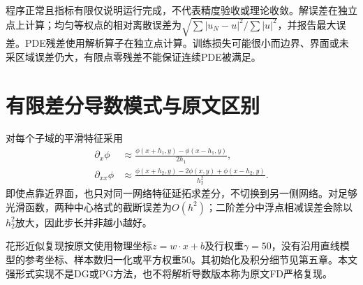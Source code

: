 程序正常且指标有限仅说明运行完成，不代表精度验收或理论收敛。解误差在独立点上计算；均匀等权点的相对离散误差为$\sqrt{\sum|u_N-u|^2/\sum|u|^2}$，并报告最大误差。PDE残差使用解析算子在独立点计算。训练损失可能很小而边界、界面或未采区域误差仍大，有限点零残差不能保证连续PDE被满足。

\section{有限差分导数模式与原文区别}
对每个子域的平滑特征采用
\begin{align}
\partial_x\phi&\approx\frac{\phi(x+h_1,y)-\phi(x-h_1,y)}{2h_1},\\
\partial_{xx}\phi&\approx\frac{\phi(x+h_2,y)-2\phi(x,y)+\phi(x-h_2,y)}{h_2^2}.
\end{align}
即使点靠近界面，也只对同一网络特征延拓求差分，不切换到另一侧网络。对足够光滑函数，两种中心格式的截断误差为$O(h^2)$；二阶差分中浮点相减误差会除以$h_2^2$放大，因此步长并非越小越好。

花形近似复现按原文使用物理坐标$z=w\cdot x+b$及行权重$\gamma=50$\cite{interfacepreprint}，没有沿用直线模型的参考坐标、样本数归一化或平方权重50。其初始化及积分细节见第五章。本文强形式实现不是DG或PG方法，也不将解析导数版本称为原文FD严格复现。
